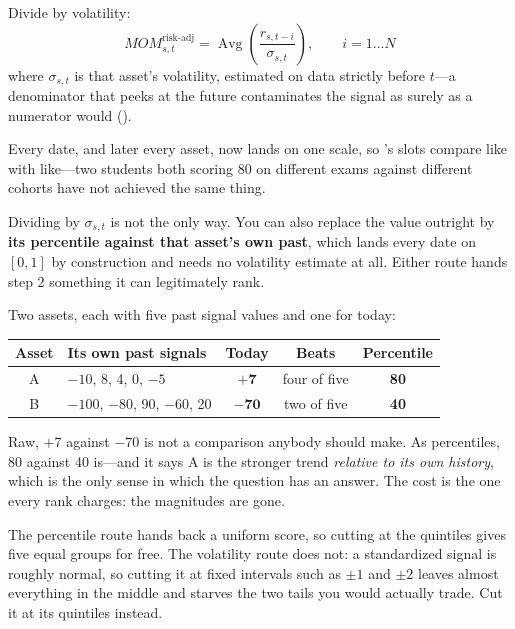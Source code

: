 Divide by volatility:
\[
  \mathit{MOM}^{\text{risk-adj}}_{s,t}
    = \operatorname{Avg}\left( \frac{r_{s,t-i}}{\sigma_{s,t}} \right), \qquad i = 1 \ldots N
\]
where $\sigma_{s,t}$ is that asset's volatility, estimated on data strictly before $t$---a
denominator that peeks at the future contaminates the signal as surely as a numerator would
().

Every date, and later every asset, now lands on one scale, so 's slots
compare like with like---two students both scoring 80 on different exams against different cohorts
have not achieved the same thing.

\begin{note}
Dividing by $\sigma_{s,t}$ is not the only way. You can also replace the value outright by \textbf{its
percentile against that asset's own past}, which lands every date on $[0, 1]$ by construction and
needs no volatility estimate at all. Either route hands step 2 something it can legitimately rank.
\end{note}

\begin{example}\label{ex:percentile}
Two assets, each with five past signal values and one for today:

\begin{center}
\begin{tabular}{|c|l|c|c|c|}
\hline
\textbf{Asset} & \textbf{Its own past signals} & \textbf{Today} & \textbf{Beats} & \textbf{Percentile} \\ \hline
A & $-10$, 8, 4, 0, $-5$          & $\mathbf{+7}$  & four of five & \textbf{80} \\ \hline
B & $-100$, $-80$, 90, $-60$, 20  & $\mathbf{-70}$ & two of five  & \textbf{40} \\ \hline
\end{tabular}
\end{center}

Raw, $+7$ against $-70$ is not a comparison anybody should make. As percentiles, 80 against 40
is---and it says A is the stronger trend \emph{relative to its own history}, which is the only sense
in which the question has an answer. The cost is the one every rank charges: the magnitudes are
gone.
\end{example}

\begin{note}
The percentile route hands back a uniform score, so cutting at the quintiles gives five equal groups
for free. The volatility route does not: a standardized signal is roughly normal, so cutting it at
fixed intervals such as $\pm 1$ and $\pm 2$ leaves almost everything in the middle and starves the
two tails you would actually trade. Cut it at its quintiles instead.
\end{note}

